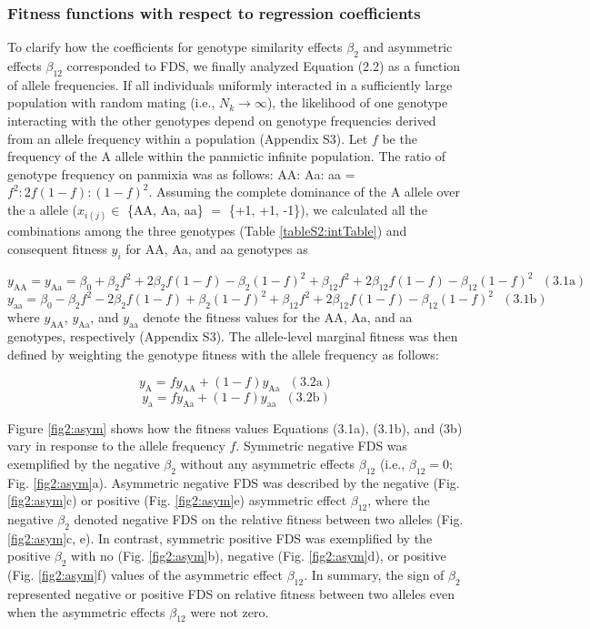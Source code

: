 \documentclass[12pt,]{article}
\begin{document}
\subsubsection{Fitness functions with respect to regression coefficients}
To clarify how the coefficients for genotype similarity effects $\beta_2$ and asymmetric effects $\beta_{12}$ corresponded to FDS, we finally analyzed Equation (2.2) as a function of allele frequencies. If all individuals uniformly interacted in a sufficiently large population with random mating (i.e., $N_k \to \infty$), the likelihood of one genotype interacting with the other genotypes depend on genotype frequencies derived from an allele frequency within a population (Appendix S3). Let $f$ be the frequency of the A allele within the panmictic infinite population. The ratio of genotype frequency on panmixia was as follows: AA: Aa: aa = $f^2:2f(1-f):(1-f)^2$. Assuming the complete dominance of the A allele over the a allele ($x_{i(j)} \in$ \{AA, Aa, aa\} $=$ \{+1, +1, -1\}), we calculated all the combinations among the three genotypes (Table \ref{tableS2:intTable}) and consequent fitness $y_i$ for AA, Aa, and aa genotypes as

$$y_\mathrm{AA} = y_\mathrm{Aa} = \beta_0 + \beta_2 f^2 + 2\beta_2 f(1-f) - \beta_2(1-f)^2 + \beta_{12}f^2 + 2\beta_{12}f(1-f) - \beta_{12}(1-f)^2~~~\mathrm{(3.1a)}$$
$$y_\mathrm{aa} = \beta_0 - \beta_2 f^2 - 2\beta_2 f(1-f) + \beta_2(1-f)^2 + \beta_{12}f^2 + 2\beta_{12}f(1-f) - \beta_{12}(1-f)^2~~~\mathrm{(3.1b)}$$
where $y_\mathrm{AA}$, $y_\mathrm{Aa}$, and $y_\mathrm{aa}$ denote the fitness values for the AA, Aa, and aa genotypes, respectively (Appendix S3). The allele-level marginal fitness was then defined by weighting the genotype fitness with the allele frequency as follows:

$$y_\mathrm{A} = f y_\mathrm{AA} + (1 - f) y_\mathrm{Aa}~~~\mathrm{(3.2a)}$$
$$y_\mathrm{a} = f y_\mathrm{Aa} + (1 - f) y_\mathrm{aa}~~~\mathrm{(3.2b)}$$

Figure \ref{fig2:asym} shows how the fitness values Equations (3.1a), (3.1b), and (3b) vary in response to the allele frequency $f$. Symmetric negative FDS was exemplified by the negative $\beta_2$ without any asymmetric effects $\beta_{12}$ (i.e., $\beta_{12}=0$; Fig. \ref{fig2:asym}a). Asymmetric negative FDS was described by the negative (Fig. \ref{fig2:asym}c) or positive (Fig. \ref{fig2:asym}e) asymmetric effect $\beta_{12}$, where the negative $\beta_2$ denoted negative FDS on the relative fitness between two alleles (Fig. \ref{fig2:asym}c, e). In contrast, symmetric positive FDS was exemplified by the positive $\beta_2$ with no (Fig. \ref{fig2:asym}b), negative (Fig. \ref{fig2:asym}d), or positive (Fig. \ref{fig2:asym}f) values of the asymmetric effect $\beta_{12}$. In summary, the sign of $\beta_2$ represented negative or positive FDS on relative fitness between two alleles even when the asymmetric effects $\beta_{12}$ were not zero.
\end{document}
